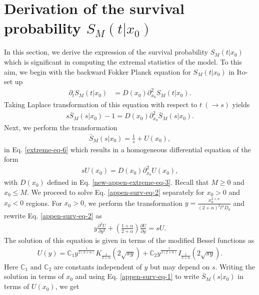 \documentclass[superscriptaddress,amsmath,amssymb,aps,onecolumn]{revtex4}
\begin{document}
\section{Derivation of the survival probability $S_M(t|x_0)$}
\label{appen-surv}
In this section, we derive the expression of the survival probability $S_M(t|x_0)$ which is significant in computing the extremal statistics of the model. To this aim, we begin with the backward Fokker Planck equation for $S_M(t|x_0)$ in Ito-set up \cite{newRedner}
\begin{align}
 \partial _t S_M(t|x_0) & = D(x_0) \partial _{x_0 } ^2 S_M(t|x_0). 
\end{align} 
Taking Laplace transformation of this equation with respect to $t ~(\to s)$ yields
\begin{align}
s \bar{S}_M(s|x_0)-1 = D(x_0) \partial _{x_0 }^2 \bar{S}_M(s|x_0).
\label{extreme-eq-6}
\end{align}
Next, we perform the transformation
\begin{align}
\bar{S}_M(s|x_0)=\frac{1}{s}+U(x_0),
\label{appen-surv-eq-1}
\end{align}
in Eq. \eqref{extreme-eq-6} which results in a homogeneous differential equation of the form
\begin{align}
s U(x_0) = D(x_0) \partial _{x_0 }^2 U(x_0),
\label{appen-surv-eq-2}
\end{align}
with $D(x_0)$ defined in Eq. \eqref{new-appen-extreme-eq-3}. Recall that $M \geq 0$ and $x_0 \leq M$. We proceed to solve Eq. \eqref{appen-surv-eq-2} separately for $x_0 >0$ and $x_0 <0$ regions. For $x_0 >0$, we perform the transformation $y = \frac{x_0 ^{2+\alpha}}{(2+\alpha)^2 l^{\alpha} D_0}$ and rewrite Eq. \eqref{appen-surv-eq-2} as
\begin{align}
y \frac{\partial ^2 U}{\partial y^2} + \left(\frac{1+\alpha}{2+\alpha} \right) \frac{\partial  U}{\partial y} = s U.
\label{appen-surv-eq-3}
\end{align}
The solution of this equation is given in terms of the modified Bessel functions as
\begin{align}
U(y) = \mathbb{C}_1 y^{\frac{1}{2(2+\alpha)}} K_{\frac{1}{2+\alpha}} \left( 2 \sqrt{s y}\right)+\mathbb{C}_2 y^{\frac{1}{2(2+\alpha)}} I_{\frac{1}{2+\alpha}} \left( 2 \sqrt{s y}\right).
\label{appen-surv-eq-4}
\end{align}
Here $\mathbb{C}_1$ and $\mathbb{C}_2$ are constants independent of $y$ but may depend on $s$. Writing the solution in terms of $x_0$ and using Eq. \eqref{appen-surv-eq-1} to write $\bar{S}_M(s|x_0)$ in terms of $U(x_0)$, we get
\end{document}

